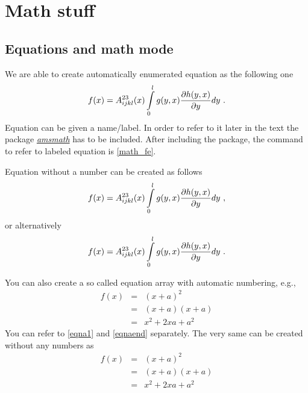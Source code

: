 \documentclass[a4paper]{book}
\newcommand{\imp}[1]{\underline{\textit{#1}}}
\begin{document}

\chapter{Math stuff}


\section{Equations and math mode}

We are able to create automatically enumerated equation as the following one
\begin{equation}
	f(x)
	= A^{23}_{ijkl}(x) \int_0^l\limits g(y,x) \frac{\partial h(y,x)}{\partial y} d y \ .
	\label{math_fe}
\end{equation}
Equation can be given a name/label. In order to refer to it later in the text the package \imp{amsmath} has to be included. After including the package, the command to refer to labeled equation is \eqref{math_fe}.

Equation without a number can be created as follows
\begin{equation*}
	f(x)
	= A^{23}_{ijkl}(x) \int_0^l\limits g(y,x) \frac{\partial h(y,x)}{\partial y} d y \ ,
\end{equation*}
or alternatively 
\[
	f(x)
	= A^{23}_{ijkl}(x) \int_0^l\limits g(y,x) \frac{\partial h(y,x)}{\partial y} d y \ .
\]

You can also create a so called equation array with automatic numbering, e.g.,
\begin{eqnarray}
	f(x)
		&=& (x+a)^2 \label{eqna1} \\
		&=& (x+a)(x+a) \label{eqna2}\\
		&=& x^2 + 2 x a + a^2
	\label{eqnaend}
\end{eqnarray}
You can refer to \eqref{eqna1} and \eqref{eqnaend} separately. The very same can be created without any numbers as
\begin{eqnarray*}
	f(x)
		&=& (x+a)^2 \\
		&=& (x+a)(x+a) \\
		&=& x^2 + 2 x a + a^2
\end{eqnarray*}
\end{document}
